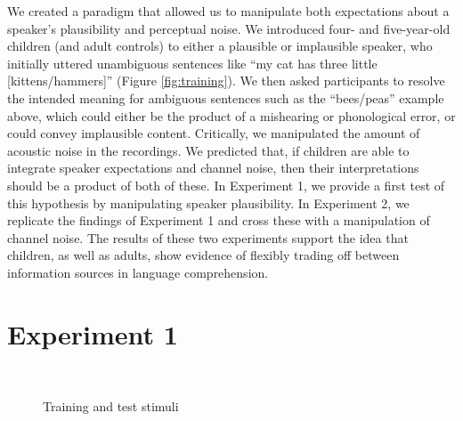 \documentclass[man,floatsintext]{apa6}
\begin{document}
We created a paradigm that allowed us to manipulate both expectations about a speaker's plausibility and perceptual noise. We introduced four- and five-year-old children (and adult controls) to either a plausible or implausible speaker, who initially uttered unambiguous sentences like ``my cat has three little [kittens/hammers]'' (Figure \ref{fig:training}). We then asked participants to resolve the intended meaning for ambiguous sentences such as the ``bees/peas'' example above, which could either be the product of a mishearing or phonological error, or could convey implausible content. Critically, we manipulated the amount of acoustic noise in the recordings. We predicted that, if children are able to integrate speaker expectations and channel noise, then their interpretations should be a product of both of these. In Experiment 1, we provide a first test of this hypothesis by manipulating speaker plausibility. In Experiment 2, we replicate the findings of Experiment 1 and cross these with a manipulation of channel noise. The results of these two experiments support the idea that children, as well as adults, show evidence of flexibly trading off between information sources in language comprehension.

\section{Experiment 1}

\begin{figure}[t]
     \begin{center}
        \\
    \end{center}
    \caption{Training and test stimuli
     }%
   \label{fig:stimuli}
\end{figure}
\end{document}
